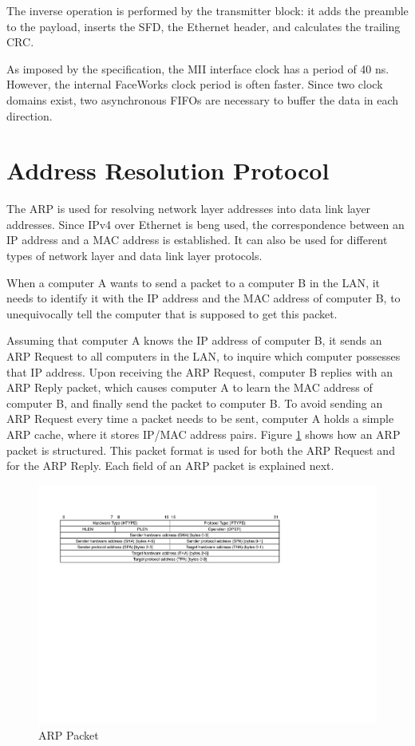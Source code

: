 \documentclass[defaultstyle,10pt,master,Helvetica]{thesis}
\begin{document}
The inverse operation is performed by the transmitter block: it adds the preamble to the payload, inserts the \ac{SFD}, the Ethernet header, and calculates the trailing \ac{CRC}.

As imposed by the specification, the \ac{MII} interface clock has a period of 40 ns. However, the internal FaceWorks clock period is often faster. Since two clock domains exist, two asynchronous \acp{FIFO} are necessary to buffer the data in each direction.

\section{Address Resolution Protocol}
\nocite{rfc2119}

The \acf{ARP}\cite{rfc826} is used for resolving network layer addresses into data link layer addresses. Since IPv4 over Ethernet is beng used, the correspondence between an \ac{IP} address and a \ac{MAC} address is established. It can also be used for different types of network layer and data link layer protocols.

When a computer A wants to send a packet to a computer B in the \ac{LAN}, it needs to identify it with the \ac{IP} address and the \ac{MAC} address of computer B, to unequivocally tell the computer that is supposed to get this packet.

Assuming that computer A knows the \ac{IP} address of computer B, it sends an \ac{ARP} Request to all computers in the \ac{LAN}, to inquire which computer possesses that \ac{IP} address. Upon receiving the \ac{ARP} Request, computer B replies with an \ac{ARP} Reply packet, which causes computer A to learn the \ac{MAC} address of computer B, and finally send the packet to computer B. To avoid sending an \ac{ARP} Request every time a packet needs to be sent, computer A holds a simple \ac{ARP} cache, where it stores \ac{IP}/\ac{MAC} address pairs. Figure \ref{fig:Arp-eth} shows how an \ac{ARP} packet is structured. This packet format is used for both the \ac{ARP} Request and for the \ac{ARP} Reply. Each field of an \ac{ARP} packet is explained next.

\begin{figure}[h]
  \centering
      \includegraphics[scale=0.80,center]{Diagrams/ARP.pdf}
  \caption{\ac{ARP} Packet}\label{fig:Arp-eth}
\end{figure}
\end{document}
